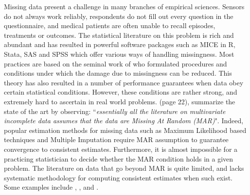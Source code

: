 \documentclass[12pt]{article}
\begin{document}
Missing data present a challenge in many branches
of empirical sciences.  Sensors do not always work
reliably, respondents do not fill out every question
in the questionnaire, and medical patients are often unable to recall episodes, treatments or outcomes.
The statistical literature on this problem is rich and abundant and has resulted in
 powerful software
packages such as MICE in R, Stata, SAS and SPSS which offer various ways of handling missingness.  
Most practices are based on the seminal  work of 
\cite{Rubin_missing} who formulated procedures
and conditions under which the damage due to missingness
 can be reduced.  This theory has also resulted in
a number of performance guarantees when data obey certain
statistical conditions.  However, these conditions are rather strong, and
extremely hard to ascertain in real world problems. 
 \cite{Rubin2014}(page 22), summarize the state of
the art by observing: 
 ``\textit{essentially all the literature on multivariate incomplete data assumes that the data
are Missing At Random (MAR)}". 
Indeed, popular estimation  methods for missing data such as Maximum Likelihood based techniques \citep{dempster1977maximum} and Multiple Imputation \citep{rubin1978multiple} require MAR assumption to guarantee convergence to consistent estimates. 
%
Furthermore, it is almost impossible for a practicing statistician to decide whether the MAR condition holds in a given  problem. The literature on data that go beyond MAR is quite limited, and lacks systematic methodology for computing consistent estimates when such exist. 
 Some examples include \cite{fitzmaurice2008generalized}, \cite{carpenter2014missing}, \cite{robins2000robust} and \cite{scharfstein1999adjusting}. 
\end{document}
